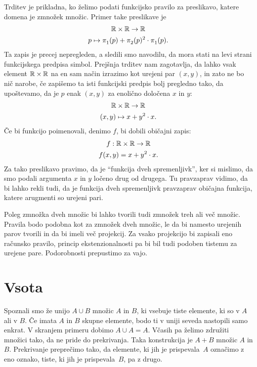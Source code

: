 Trditev je prikladna, ko želimo podati funkcijsko pravilo za preslikavo, katere domena je
zmnožek množic. Primer take preslikave je
%
\begin{gather*}
  \RR \times \RR \to \RR \\
  p \mapsto \fst(p) + \snd(p)^2 \cdot \fst(p).
\end{gather*}
%
Ta zapis je precej nepregleden, a sledili smo navodilu, da mora stati na levi strani
funkcijskega predpisa simbol. Prejšnja trditev nam zagotavlja, da lahko vsak element
$\mathbb{R} \times \mathbb{R}$ na en sam način izrazimo kot urejeni par $(x, y)$, in zato ne bo nič
narobe, če zapišemo ta isti funkcijski predpis bolj pregledno tako, da upoštevamo, da
je $p$ enak $(x, y)$ za enolično določena $x$ in $y$:
%
\begin{gather*}
  \mathbb{R} \times \mathbb{R} \to \mathbb{R} \\
  (x, y) \mapsto x + y^2 \cdot x.
\end{gather*}
%
Če bi funkcijo poimenovali, denimo $f$, bi dobili običajni zapis:
%
\begin{gather*}
  f : \mathbb{R} \times \mathbb{R} \to \mathbb{R} \\
  f(x, y) = x + y^2 \cdot x.
\end{gather*}
%
Za tako preslikavo pravimo, da je ``funkcija dveh spremenljivk'', ker si mislimo, da smo
podali argumenta $x$ in $y$ ločeno drug od drugega. Tu pravzaprav vidimo, da bi lahko
rekli tudi, da je funkcija dveh spremenljivk pravzaprav običajna funkcija, katere
arugmenti so urejeni pari.

Poleg zmnožka dveh množic bi lahko tvorili tudi zmnožek treh ali več množic. Pravila bodo
podobna kot za zmnožek dveh množic, le da bi namesto urejenih parov tvorili  in da bi imeli več projekcij. Za vsako projekcijo bi zapisali eno računsko
pravilo, princip ekstenzionalnosti pa bi bil tudi podoben tistemu za urejene pare.
Podorobnosti prepustimo za vajo.


\section{Vsota}
\label{sec:vsota}

Spoznali smo že unijo $A \cup B$ množic $A$ in $B$, ki vsebuje tiste elemente, ki so v $A$
ali v $B$. Če imata $A$ in $B$ skupne elemente, bodo ti v uniji seveda nastopili samo
enkrat. V skranjem primeru dobimo $A \cup A = A$. Včasih pa želimo združiti množici tako,
da ne pride do prekrivanja. Taka konstrukcija je  $A + B$ množic $A$ in $B$.
Prekrivanje preprečimo tako, da elemente, ki jih je prispevala~$A$ označimo z eno oznako,
tiste, ki jih je prispevala~$B$, pa z drugo.

